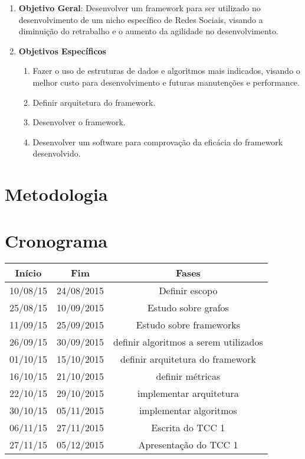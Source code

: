 \begin{enumerate}
	\item \textbf{Objetivo Geral}: Desenvolver um framework para ser utilizado no desenvolvimento de um nicho específico de Redes Sociais, visando a diminuição do retrabalho e o aumento da agilidade no desenvolvimento.

	\item \textbf{Objetivos Específicos}
	\begin{enumerate}
		\item Fazer o uso de estruturas de dados e algoritmos mais indicados, visando o melhor custo para desenvolvimento e futuras manutenções e performance.
		\item Definir arquitetura do framework.
		\item Desenvolver o framework.
		\item Desenvolver um software para comprovação da eficácia do framework desenvolvido.
	\end{enumerate}
\end{enumerate}

\section*{Metodologia}

\section*{Cronograma}

\begin{tabular}{SSS} \toprule
    {Início} & {Fim} & {Fases} \\ \toprule
    {10/08/15} & {24/08/2015} & {Definir escopo} \\
    {25/08/15} & {10/09/2015} & {Estudo sobre grafos} \\
    {11/09/15} & {25/09/2015} & {Estudo sobre frameworks} \\ \midrule
    {26/09/15} & {30/09/2015} & {definir algoritmos a serem utilizados} \\
    {01/10/15} & {15/10/2015} & {definir arquitetura do framework} \\
    {16/10/15} & {21/10/2015} & {definir métricas} \\ \midrule
    {22/10/15} & {29/10/2015} & {implementar arquitetura} \\
    {30/10/15} & {05/11/2015} & {implementar algoritmos} \\ \midrule
    {06/11/15} & {27/11/2015} & {Escrita do TCC 1} \\
    {27/11/15} & {05/12/2015} & {Apresentação do TCC 1} \\ \bottomrule
\end{tabular}

\postextual

 


